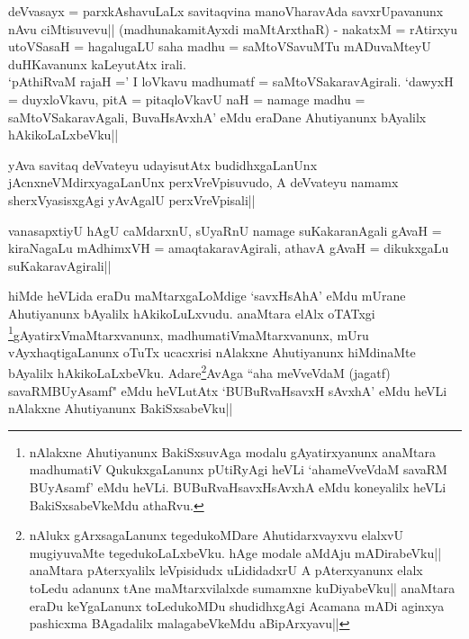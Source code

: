 
\begin{artha}
deVvasayx = parxkAshavuLaLx savitaqvina manoVharavAda savxrUpavanunx 
nAvu ciMtisuvevu|| (madhunakamitAyxdi maMtArxthaR) - nakatxM = 
rAtirxyu utoVSasaH = hagalugaLU saha madhu = saMtoVSavuMTu mADuvaMteyU 
duHKavanunx kaLeyutAtx irali.\\
`pAthiRvaM rajaH =' I loVkavu madhumatf = saMtoVSakaravAgirali. `dawyxH 
= duyxloVkavu, pitA = pitaqloVkavU naH = namage madhu = 
saMtoVSakaravAgali, BuvaHsAvxhA' eMdu eraDane Ahutiyanunx bAyalilx 
hAkikoLaLxbeVku||
\end{artha}


\begin{artha}
yAva savitaq deVvateyu udayisutAtx budidhxgaLanUnx 
jAcnxneVMdirxyagaLanUnx perxVreVpisuvudo, A deVvateyu namamx 
sherxVyasisxgAgi yAvAgalU perxVreVpisali||
\end{artha}


\begin{artha}
vanasapxtiyU hAgU caMdarxnU, sUyaRnU namage suKakaranAgali gAvaH = 
kiraNagaLu mAdhimxVH = amaqtakaravAgirali, athavA gAvaH = dikukxgaLu 
suKakaravAgirali||
\end{artha}

\begin{artha}
hiMde heVLida eraDu maMtarxgaLoMdige `savxHsAhA' eMdu mUrane 
Ahutiyanunx bAyalilx hAkikoLuLxvudu. anaMtara elAlx oTATxgi 
\footnote[1]{nAlakxne Ahutiyanunx BakiSxsuvAga modalu gAyatirxyanunx 
anaMtara madhumatiV QukukxgaLanunx pUtiRyAgi heVLi `ahameVveVdaM 
savaRM BUyAsamf' eMdu heVLi. BUBuRvaHsavxHsAvxhA eMdu koneyalilx heVLi 
BakiSxsabeVkeMdu athaRvu.}gAyatirxVmaMtarxvanunx, madhumatiVmaMtarxvanunx, mUru 
vAyxhaqtigaLanunx oTuTx ucacxrisi nAlakxne Ahutiyanunx hiMdinaMte 
bAyalilx hAkikoLaLxbeVku. Adare\footnote[2]{nAlukx gArxsagaLanunx 
tegedukoMDare Ahutidarxvayxvu elalxvU mugiyuvaMte tegedukoLaLxbeVku. 
hAge modale aMdAju mADirabeVku|| anaMtara pAterxyalilx leVpisidudx 
uLididadxrU A pAterxyanunx elalx toLedu adanunx tAne maMtarxvilalxde 
sumamxne kuDiyabeVku|| anaMtara eraDu keYgaLanunx toLedukoMDu 
shudidhxgAgi Acamana mADi aginxya pashicxma BAgadalilx malagabeVkeMdu 
aBipArxyavu||}AvAga ``aha meVveVdaM 
(jagatf) savaRMBUyAsamf" eMdu heVLutAtx `BUBuRvaHsavxH sAvxhA' eMdu 
heVLi nAlakxne Ahutiyanunx BakiSxsabeVku||
\end{artha}

